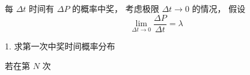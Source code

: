 
每 $\Delta t$ 时间有 $\Delta P$ 的概率中奖， 考虑极限 $\Delta t\to 0$ 的情况， 假设
\begin{equation}
\lim_{\Delta t\to 0}\frac{\Delta P}{\Delta t} = \lambda
\end{equation}


1. 求第一次中奖时间概率分布

若在第 $N$ 次
\begin{equation}

\end{equation}

